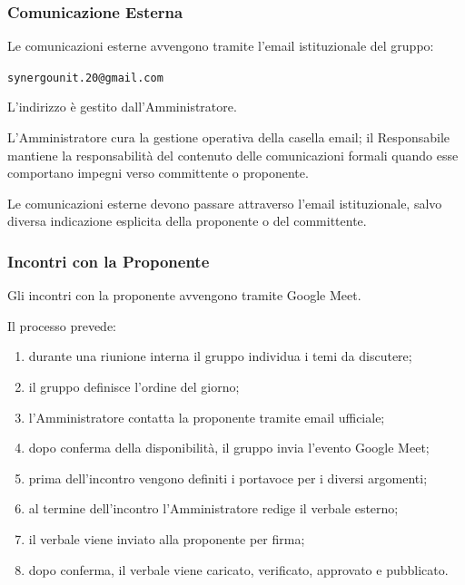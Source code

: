 
\subsubsection{Comunicazione Esterna}

Le comunicazioni esterne avvengono tramite l'email istituzionale del gruppo:

\begin{center}
    \texttt{synergounit.20@gmail.com}
\end{center}

L'indirizzo è gestito dall'Amministratore.

L'Amministratore cura la gestione operativa della casella email; il Responsabile
mantiene la responsabilità del contenuto delle comunicazioni formali quando esse
comportano impegni verso committente o proponente.

Le comunicazioni esterne devono passare attraverso l'email istituzionale, salvo
diversa indicazione esplicita della proponente o del committente.


\subsubsection{Incontri con la Proponente}

Gli incontri con la proponente avvengono tramite Google Meet.

Il processo prevede:

\begin{enumerate}
    \item durante una riunione interna il gruppo individua i temi da discutere;
    \item il gruppo definisce l'ordine del giorno;
    \item l'Amministratore contatta la proponente tramite email ufficiale;
    \item dopo conferma della disponibilità, il gruppo invia l'evento Google Meet;
    \item prima dell'incontro vengono definiti i portavoce per i diversi argomenti;
    \item al termine dell'incontro l'Amministratore redige il verbale esterno;
    \item il verbale viene inviato alla proponente per firma;
    \item dopo conferma, il verbale viene caricato, verificato, approvato e pubblicato.
\end{enumerate}

